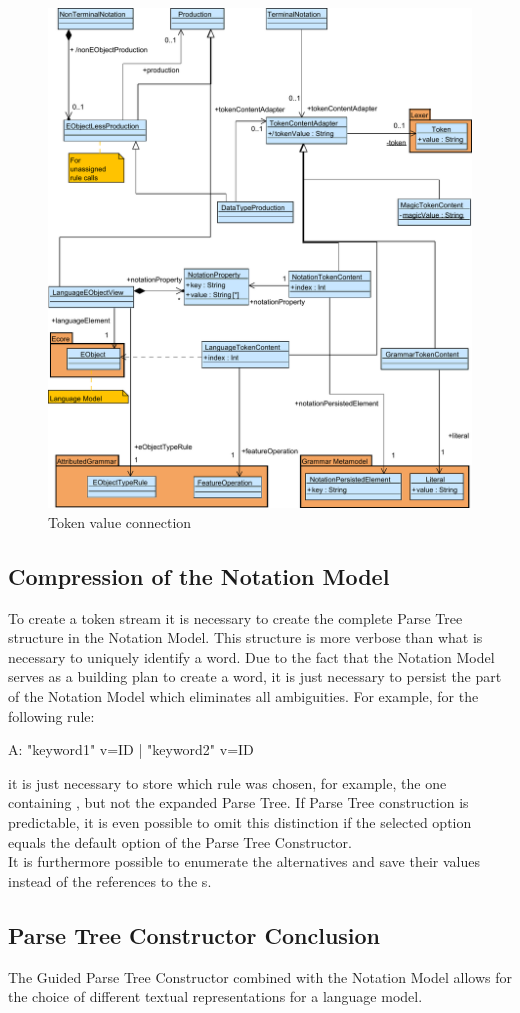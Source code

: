 \begin{figure}
\centering
\includegraphics[scale=0.68]{gfx/ex/Notation_DataLink} 
\caption{Token value connection}
\label{MM:Not:DataLink}
\end{figure}

\subsection{Compression of the Notation Model}
To create a token stream it is necessary to create the complete Parse Tree structure in the Notation Model. This structure is more verbose than what is necessary to uniquely identify a word. Due to the fact that the Notation Model serves as a building plan to create a word, it is just necessary to persist the part of the Notation Model which eliminates all ambiguities. For example, for the following rule:
\begin{xtxt}
A:  "keyword1" v=ID 
 |  "keyword2" v=ID
\end{xtxt}
it is just necessary to store which rule was chosen, for example, the one containing , but not the expanded Parse Tree. If Parse Tree construction is predictable, it is even possible to omit this distinction if the selected option equals the default option of the Parse Tree Constructor.  \\
It is furthermore possible to enumerate the alternatives and save their values instead of the references to the s.

\subsection{Parse Tree Constructor Conclusion}
The Guided Parse Tree Constructor combined with the Notation Model allows for the choice of different textual representations for a language model. 



